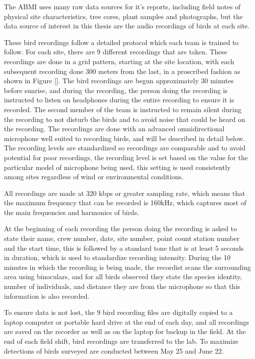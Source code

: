 \documentclass[12pt,oneside]{book}
\begin{document}
The ABMI uses many raw data sources for it's reports, including field
notes of physical site characteristics, tree cores, plant samples and
photographs, but the data source of interest in this thesis are the
audio recordings of birds at each site.

These bird recordings follow a detailed protocol which each team is
trained to follow.  For each site, there are 9 different recordings
that are taken.  These recordings are done in a grid pattern, starting
at the site location, with each subsequent recording done 300 meters
from the last, in a proscribed fashion as shown in Figure \ref{}.  The
bird recordings are begun approximately 30 minutes before sunrise, and
during the recording, the person doing the recording is instructed to
listen on headphones during the entire recording to ensure it is
recorded.  The second member of the team is instructed to remain
silent during the recording to not disturb the birds and to avoid
noise that could be heard on the recording.  The recordings are done
with an advanced omnidirectional microphone well suited to recording
birds, and will be described in detail below.  The recording levels
are standardized so recordings are comparable and to avoid potential
for poor recordings, the recording level is set based on the value for
the particular model of microphone being used, this setting is used
consistently among sites regardless of wind or environmental
conditions.

All recordings are made at 320 kbps or greater sampling rate, which
means that the maximum frequency that can be recorded is 160kHz, which
captures most of the main frequencies and harmonics of birds.

At the beginning of each recording the person doing the recording is
asked to state their name, crew number, date, site number, point count
station number and the start time, this is followed by a standard tone
that is at least 5 seconds in duration, which is used to standardize
recording intensity.  During the 10 minutes in which the recording is
being made, the recordist scans the surrounding area using binoculars,
and for all birds observed they state the species identity, number of
individuals, and distance they are from the microphone so that this
information is also recorded.

To ensure data is not lost, the 9 bird recording files are digitally
copied to a laptop computer or portable hard drive at the end of each
day, and all recordings are saved on the recorder as well as on the
laptop for backup in the field.  At the end of each field shift, bird
recordings are transferred to the lab.  To maximize detections of
birds surveyed are conducted between May 25 and June 22.  
\end{document}
